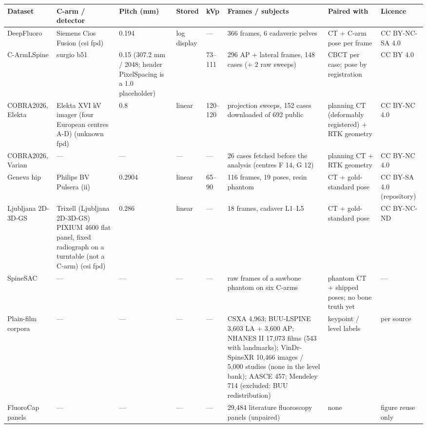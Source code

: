 \begin{tabular}{llllllll}
\toprule
Dataset & C-arm / detector & Pitch (mm) & Stored & kVp & Frames / subjects & Paired with & Licence \\
\midrule
DeepFluoro & Siemens Cios Fusion (csi fpd) & 0.194 & log display & — & 366 frames, 6 cadaveric pelves & CT + C-arm pose per frame & CC BY-NC-SA 4.0 \\
C-ArmLSpine & surgio b51 & 0.15 (307.2 mm / 2048; header PixelSpacing is a 1.0 placeholder) &  & 73--111 & 296 AP + lateral frames, 148 cases (+ 2 raw sweeps) & CBCT per case; pose by registration & CC BY 4.0 \\
COBRA2026, Elekta & Elekta XVI kV imager (four European centres A-D) (unknown fpd) & 0.8 & linear & 120--120 & projection sweeps, 152 cases downloaded of 692 public & planning CT (deformably registered) + RTK geometry & CC BY-NC 4.0 \\
COBRA2026, Varian & — & — & — & — & 26 cases fetched before the analysis (centres F 14, G 12) & planning CT + RTK geometry & CC BY-NC 4.0 \\
Geneva hip & Philips BV Pulsera (ii) & 0.2904 & linear & 65--90 & 116 frames, 19 poses, resin phantom & CT + gold-standard pose & CC BY-SA 4.0 (repository) \\
Ljubljana 2D-3D-GS & Trixell (Ljubljana 2D-3D-GS) PIXIUM 4600 flat panel, fixed radiograph on a turntable (not a C-arm) (csi fpd) & 0.286 & linear & — & 18 frames, cadaver L1--L5 & CT + gold-standard pose & CC BY-NC-ND \\
SpineSAC & — & — & — & — & raw frames of a sawbone phantom on six C-arms & phantom CT + shipped poses; no bone truth yet & — \\
Plain-film corpora & — & — & — & — & CSXA 4,963; BUU-LSPINE 3,603 LA + 3,600 AP; NHANES II 17,073 films (543 with landmarks); VinDr-SpineXR 10,466 images / 5,000 studies (none in the level bank); AASCE 457; Mendeley 714 (excluded: BUU redistribution) & keypoint / level labels & per source \\
FluoroCap panels & — & — & — & — & 29,484 literature fluoroscopy panels (unpaired) & none & figure reuse only \\
\bottomrule
\end{tabular}
